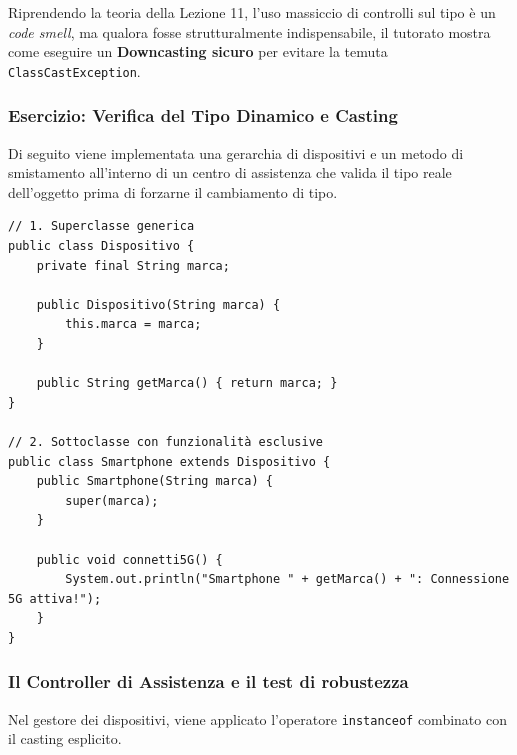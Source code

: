 \documentclass[12pt, a4paper]{article}
\begin{document}
Riprendendo la teoria della Lezione 11, l'uso massiccio di controlli sul tipo è un \textit{code smell}, ma qualora fosse strutturalmente indispensabile, il tutorato mostra come eseguire un \textbf{Downcasting sicuro} per evitare la temuta \texttt{ClassCastException}.

\newpage

\subsubsection{Esercizio: Verifica del Tipo Dinamico e Casting}
Di seguito viene implementata una gerarchia di dispositivi e un metodo di smistamento all'interno di un centro di assistenza che valida il tipo reale dell'oggetto prima di forzarne il cambiamento di tipo.

\begin{verbatim}
// 1. Superclasse generica
public class Dispositivo {
    private final String marca;

    public Dispositivo(String marca) {
        this.marca = marca;
    }

    public String getMarca() { return marca; }
}

// 2. Sottoclasse con funzionalità esclusive
public class Smartphone extends Dispositivo {
    public Smartphone(String marca) {
        super(marca);
    }

    public void connetti5G() {
        System.out.println("Smartphone " + getMarca() + ": Connessione 5G attiva!");
    }
}
\end{verbatim}

\subsubsection{Il Controller di Assistenza e il test di robustezza}
Nel gestore dei dispositivi, viene applicato l'operatore \texttt{instanceof} combinato con il casting esplicito.
\end{document}
